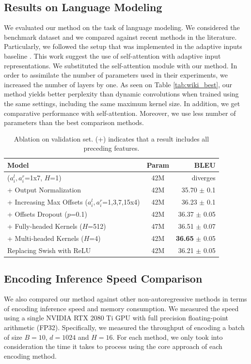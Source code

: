 \documentclass{article}
\begin{document}
\subsection{Results on Language Modeling}
We evaluated our method on the task of language modeling. We considered the \wiki{} benchmark dataset and we compared against recent methods in the literature. Particularly, we followed the setup that was implemented in the adaptive inputs baseline \cite{DBLP:journals/corr/abs-1809-10853}. This work suggest the use of self-attention with adaptive input representations. We substituted the self-attention module with our method. In order to assimilate the number of parameters used in their experiments, we increased the number of layers by one. As seen on Table \ref{tab:wiki_best}, our method yields better perplexity than dynamic convolutions when trained using the same settings, including the same maximum kernel size. In addition, we get comparative performance with self-attention. Moreover, we use less number of parameters than the best comparison methods. 


\begin{table}[t]
\centering
\caption{Ablation on \iwslt{} validation set. (+) indicates that a result includes all preceding features.}
\vskip 0.15in
\begin{tabular}{lcr}
\toprule
Model & Param & BLEU \\
\midrule
\talkconvfull{} ($a_i^l,a_i^r$=1x7, $H$=1) & 42M & diverges \\
+ Output Normalization & 42M & 35.70 $\pm$ 0.1 \\
+ Increasing Max Offsets ($a_i^l,a_i^r$=1,3,7,15x4) & 42M & 36.23 $\pm$ 0.1 \\
+ Offsets Dropout ($p$=0.1) & 42M & 36.37 $\pm$ 0.05 \\
+ Fully-headed Kernels ($H$=512) & 47M & 36.51 $\pm$ 0.07 \\
+ Multi-headed Kernels ($H$=4) & 42M & \textbf{36.65} $\pm$ 0.05 \\
\midrule
Replacing Swish with ReLU & 42M & 36.21 $\pm$ 0.05 \\
\bottomrule
\end{tabular}
\label{tab:ablation}
\end{table}

\subsection{Encoding Inference Speed Comparison}
We also compared our method against other non-autoregressive methods in terms of encoding inference speed and memory consumption. We measured the speed using a single NVIDIA RTX 2080 Ti GPU with full precision floating-point arithmetic (FP32). Specifically, we measured the throughput of encoding a batch of size $B=10$, $d=1024$ and $H=16$. For each method, we only took into consideration the time it takes to process using the core approach of each encoding method. 
\end{document}
